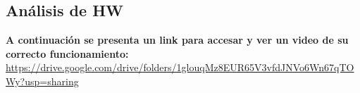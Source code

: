 \subsection{Análisis de HW}
 \textbf{A continuación se presenta un link para accesar y ver un video de su correcto funcionamiento:}\\

\hspace{0.5mm}\url{https://drive.google.com/drive/folders/1glouqMz8EUR65V3vfdJNVo6Wn67qTOWy?usp=sharing} 